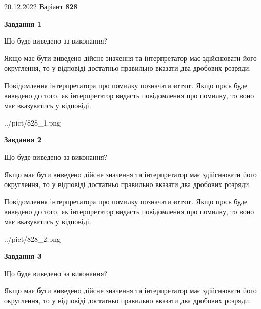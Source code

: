 \documentclass[12pt, ukrainian]{article}
\begin{document}
{20.12.2022 Варіант \No \textbf { 828 }\par}
{
\begin {Large}

{\begin {center}\textbf{Завдання 1}\end {center}}\par
Що буде виведено за виконання? \par

Якщо має бути виведено дійсне значення та інтерпретатор має здійснювати його округлення, 
то у відповіді достатньо правильно вказати два дробових розряди.

Повідомлення інтерпретатора про помилку позначати \textbf{error}.
Якщо щось буде виведено до того, як інтерпретатор видасть повідомлення про помилку, 
то воно має вказуватись у відповіді. \par

\begin{center}
	{../pict/828_1.png}
\end{center}
\newpage

{\begin {center}\textbf{Завдання 2}\end {center}}\par
Що буде виведено за виконання? \par

Якщо має бути виведено дійсне значення та інтерпретатор має здійснювати його округлення, 
то у відповіді достатньо правильно вказати два дробових розряди.

Повідомлення інтерпретатора про помилку позначати \textbf{error}.
Якщо щось буде виведено до того, як інтерпретатор видасть повідомлення про помилку, 
то воно має вказуватись у відповіді. \par

\begin{center}
	{../pict/828_2.png}
\end{center}
\newpage

{\begin {center}\textbf{Завдання 3}\end {center}}\par
Що буде виведено за виконання? \par

Якщо має бути виведено дійсне значення та інтерпретатор має здійснювати його округлення, 
то у відповіді достатньо правильно вказати два дробових розряди.


\end{Large}}
\end{document}
